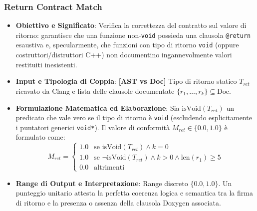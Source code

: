 \subsubsection{Return Contract Match}
\label{subsubsec:return_contract}
\begin{itemize}[leftmargin=*, label=\textbullet]
    \item \textbf{Obiettivo e Significato}: Verifica la correttezza del contratto sul valore di ritorno: garantisce che una funzione non-\texttt{void} possieda una clausola \texttt{@return} esaustiva e, specularmente, che funzioni con tipo di ritorno \texttt{void} (oppure costruttori/distruttori C++) non documentino ingannevolmente valori restituiti inesistenti.
    \item \textbf{Input e Tipologia di Coppia}: \textbf{[AST vs Doc]} Tipo di ritorno statico $T_{ret}$ ricavato da Clang e lista delle clausole documentate $\{r_1, \dots, r_k\} \subseteq \text{Doc}$.
    \item \textbf{Formulazione Matematica ed Elaborazione}: Sia $\text{isVoid}(T_{ret})$ un predicato che vale vero se il tipo di ritorno è \texttt{void} (escludendo esplicitamente i puntatori generici \texttt{void*}). Il valore di conformità $M_{ret} \in \{0.0, 1.0\}$ è formulato come:
    \begin{equation}
        M_{ret} = \begin{cases}
            1.0 & \text{se } \text{isVoid}(T_{ret}) \land k = 0 \\
            1.0 & \text{se } \neg\text{isVoid}(T_{ret}) \land k > 0 \land \text{len}(r_1) \ge 5 \\
            0.0 & \text{altrimenti}
        \end{cases}
        \label{eq:return_match}
    \end{equation}
    \item \textbf{Range di Output e Interpretazione}: Range discreto $\{0.0, 1.0\}$. Un punteggio unitario attesta la perfetta coerenza logica e semantica tra la firma di ritorno e la presenza o assenza della clausola Doxygen associata.
\end{itemize}

